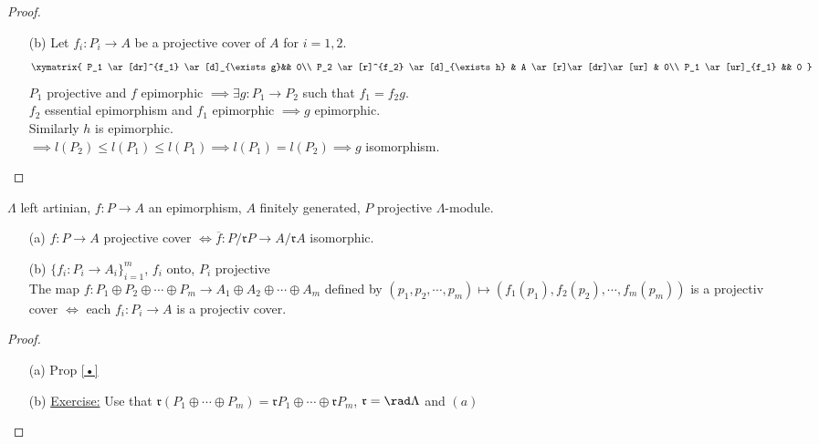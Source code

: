 \begin{thm}
\begin{proof}
\begin{enumerate}
\item[(b)] Let $f_i : P_i \to A$ be a projective cover of $A$ for $i = 1, 2$.
\[\xymatrix{
P_1 \ar[dr]^{f_1} \ar[d]_{\exists g}&& 0\\
P_2 \ar[r]^{f_2} \ar[d]_{\exists h} & A \ar[r]\ar[dr]\ar[ur] & 0\\
P_1 \ar[ur]_{f_1} && 0
}\]
$P_1$ projective and $f$ epimorphic $\implies \exists g: P_1 \to P_2$ such that $f_1 = f_2g$.\\
$f_2$ essential epimorphism and $f_1$ epimorphic $\implies g$ epimorphic.\\
Similarly $h$ is epimorphic.\\
$\implies l(P_2) \leq l(P_1) \leq l(P_1) \implies l(P_1) = l(P_2) \implies g$ isomorphism. 
\end{enumerate}
\end{proof}
\end{thm}

\begin{prop}
$\Lambda$ left artinian, $f: P \to A$ an epimorphism, $A$ finitely generated, $P$ projective $\Lambda$-module.
\begin{enumerate}
\item[(a)] $f:P \to A$ projective cover $\iff \overline{f}: P/\mathfrak{r}P \to A/\mathfrak{r}A$ isomorphic.
\item[(b)] $\{ f_i : P_i \to A_i \}_{i=1}^m$, $f_i$ onto, $P_i$ projective\\
The map $f: P_1 \oplus P_2 \oplus \cdots \oplus P_m \to A_1 \oplus A_2 \oplus \cdots \oplus A_m $ defined by $(p_1, p_2, \cdots , p_m) \mapsto (f_1(p_1), f_2(p_2), \cdots , f_m(p_m))$ is a projectiv cover $\iff$ each $f_i:P_i \to A$ is a projectiv cover.
\end{enumerate}

\begin{proof}
\begin{enumerate}
\item[]
\item[(a)] Prop \ref{•}
\item[(b)] \underline{Exercise:} Use that $\mathfrak{r}(P_1 \oplus \cdots \oplus P_m) = \mathfrak{r}P_1 \oplus \cdots \oplus \mathfrak{r}P_m$, $\mathfrak{r} = \rad \Lambda$ and $(a)$
\end{enumerate}
\end{proof}
\end{prop}
